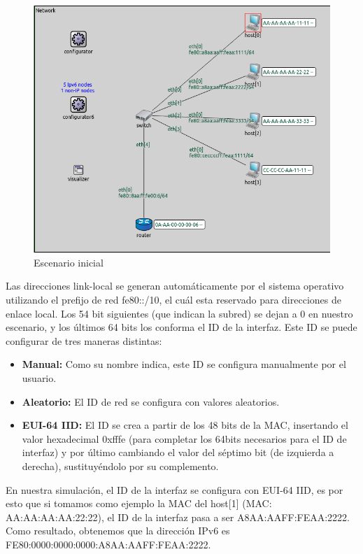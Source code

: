 \begin{figure}[h]
    \centering
    \includegraphics[width=\textwidth]{img/ej5.1.png}
    \caption{Escenario inicial}
    \label{fig:ej5.1}
\end{figure}

\begin{flushleft}
    Las direcciones link-local se generan automáticamente por el sistema operativo utilizando el prefijo de red fe80::/10, el cuál esta reservado para direcciones de enlace local. Los 54 bit siguientes (que indican la subred) se dejan a 0 en nuestro escenario, y los últimos 64 bits los conforma el ID de la interfaz. Este ID se puede configurar de tres maneras distintas:
\begin{itemize}
    \item \textbf{Manual:} Como su nombre indica, este ID se configura manualmente por el usuario.
    \item \textbf{Aleatorio:} El ID de red se configura con valores aleatorios.
    \item \textbf{EUI-64 IID:} El ID se crea a partir de los 48 bits de la MAC, insertando el valor hexadecimal 0xfffe (para completar los 64bits necesarios para el ID de interfaz) y por último cambiando el valor del séptimo bit (de izquierda a derecha), sustituyéndolo por su complemento.
\end{itemize}
En nuestra simulación, el ID de la interfaz se configura con EUI-64 IID, es por esto que si tomamos como ejemplo la MAC del host[1] (MAC: AA:AA:AA:AA:22:22), el ID de la interfaz pasa a ser A8AA:AAFF:FEAA:2222. Como resultado, obtenemos que la dirección IPv6 es FE80:0000:0000:0000:A8AA:AAFF:FEAA:2222. 
\end{flushleft}

